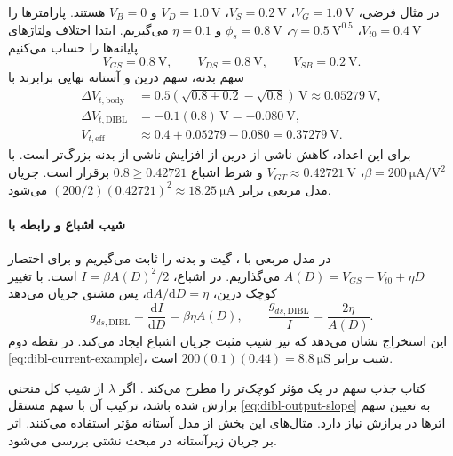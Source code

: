 در مثال فرضی، \(V_G=\qty{1.0}{\volt}\)،
\(V_S=\qty{0.2}{\volt}\)، \(V_D=\qty{1.0}{\volt}\) و \(V_B=0\)
هستند. پارامترها را \(V_{t0}=\qty{0.4}{\volt}\)،
\(\gamma=\qty{0.5}{\volt\tothe{0.5}}\)،
\(\phi_s=\qty{0.8}{\volt}\) و \(\eta=0.1\) می‌گیریم.
ابتدا اختلاف ولتاژهای پایانه‌ها را حساب می‌کنیم
\begin{equation*}
 V_{GS}=\qty{0.8}{\volt},\qquad V_{DS}=\qty{0.8}{\volt},\qquad
 V_{SB}=\qty{0.2}{\volt}.
\end{equation*}
سهم بدنه، سهم درین و آستانه نهایی برابرند با
\begin{align*}
 \Delta V_{t,\mathrm{body}}
 &=0.5\left(\sqrt{0.8+0.2}-\sqrt{0.8}\right)\,\unit{\volt}
 \approx\qty{0.05279}{\volt},\\
 \Delta V_{t,\mathrm{DIBL}}&=-0.1(0.8)\,\unit{\volt}
 =-\qty{0.080}{\volt},\\
 V_{t,\mathrm{eff}}&\approx0.4+0.05279-0.080
 =\qty{0.37279}{\volt}.
\end{align*}
برای این اعداد، کاهش ناشی از درین از افزایش ناشی از بدنه بزرگ‌تر است.
با \(\beta=\qty{200}{\micro\ampere\per\volt\squared}\)،
\(V_{GT}\approx\qty{0.42721}{\volt}\) و شرط اشباع
\(0.8\ge0.42721\) برقرار است. جریان مدل مربعی برابر
\((200/2)(0.42721)^2\approx\qty{18.25}{\micro\ampere}\) می‌شود.

\paragraph*{شیب اشباع و رابطه با }
در مدل مربعی با ، گیت و بدنه را ثابت می‌گیریم و برای اختصار
\(A(D)=V_{GS}-V_{t0}+\eta D\) می‌گذاریم. در اشباع،
\(I=\beta A(D)^2/2\) است. با تغییر کوچک درین،
\(\mathrm{d}A/\mathrm{d}D=\eta\)، پس مشتق جریان می‌دهد
\begin{equation}
 g_{ds,\mathrm{DIBL}}=\frac{\mathrm{d}I}{\mathrm{d}D}
 =\beta\eta A(D),\qquad
 \frac{g_{ds,\mathrm{DIBL}}}{I}=\frac{2\eta}{A(D)}.
 \label{eq:dibl-output-slope}
\end{equation}
این استخراج نشان می‌دهد که  نیز شیب مثبت جریان اشباع ایجاد
می‌کند. در نقطه دوم \eqref{eq:dibl-current-example}، شیب برابر
\(200(0.1)(0.44)=\qty{8.8}{\micro\siemens}\) است.

کتاب جذب سهم  در یک  مؤثر کوچک‌تر را مطرح
می‌کند \cite[صفحه چاپی ۸۰]{weste}. اگر \(\lambda\) از شیب کل منحنی
برازش شده باشد، ترکیب آن با سهم مستقل \eqref{eq:dibl-output-slope} به
تعیین سهم اثرها در برازش نیاز دارد. مثال‌های این بخش از مدل آستانه
مؤثر استفاده می‌کنند. اثر بر جریان زیرآستانه در مبحث نشتی بررسی می‌شود.

